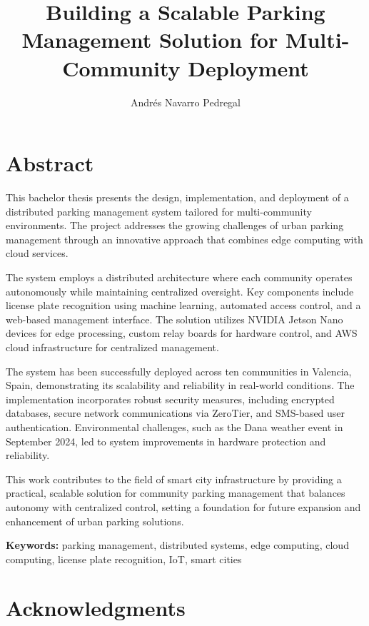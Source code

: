 \documentclass[oneside, 12pt, a4paper]{book}
\title{Building a Scalable Parking Management Solution for Multi-Community Deployment}
\author{Andrés Navarro Pedregal}
\begin{document}

\frontmatter
\maketitle

\blankpage%
\chapter*{Abstract}

This bachelor thesis presents the design, implementation, and deployment of a distributed parking management system tailored for multi-community environments. The project addresses the growing challenges of urban parking management through an innovative approach that combines edge computing with cloud services.

The system employs a distributed architecture where each community operates autonomously while maintaining centralized oversight. Key components include license plate recognition using machine learning, automated access control, and a web-based management interface. The solution utilizes NVIDIA Jetson Nano devices for edge processing, custom relay boards for hardware control, and AWS cloud infrastructure for centralized management.

The system has been successfully deployed across ten communities in Valencia, Spain, demonstrating its scalability and reliability in real-world conditions. The implementation incorporates robust security measures, including encrypted databases, secure network communications via ZeroTier, and SMS-based user authentication. Environmental challenges, such as the Dana weather event in September 2024, led to system improvements in hardware protection and reliability.

This work contributes to the field of smart city infrastructure by providing a practical, scalable solution for community parking management that balances autonomy with centralized control, setting a foundation for future expansion and enhancement of urban parking solutions.

\textbf{Keywords:} parking management, distributed systems, edge computing, cloud computing, license plate recognition, IoT, smart cities

\blankpage%

\chapter*{Acknowledgments}
\begingroup
\let\clearpage\relax %
\end{document}
